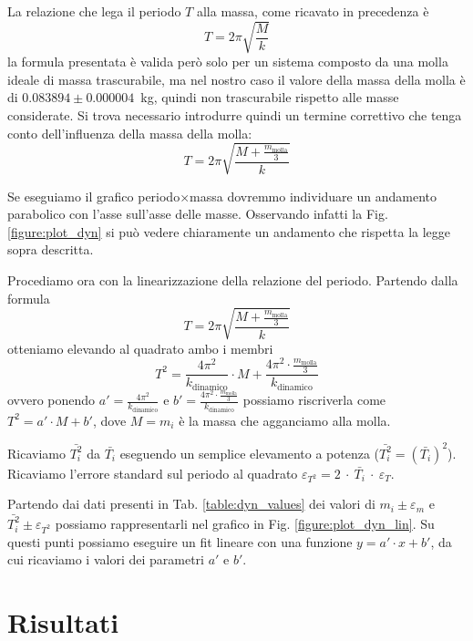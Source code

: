 \documentclass[italian, a4paper, 10pt, twocolumn]{../../style/lab_unige}
\newcommand{\reftab}[1]{Tab. {\ref{#1}}}%
\newcommand{\reffig}[1]{Fig. {\ref{#1}}}%
\begin{document}
{    La relazione che lega il periodo $T$ alla massa, come ricavato in precedenza è
    \[
        T = 2 \pi \sqrt{\frac{M}{k}}
    \]
    la formula presentata è valida però solo per un sistema composto da una molla ideale di massa trascurabile, 
    ma nel nostro caso il valore della massa della molla è di $0.083894\pm0.000004$~kg, quindi non trascurabile 
    rispetto alle masse considerate.
    Si trova necessario introdurre quindi un termine correttivo che tenga conto dell'influenza della massa della
    molla:
    \[
        T = 2 \pi \sqrt{\frac{M+\frac{m_{\text{molla}}}{3}}{k}}
    \]
    
    Se eseguiamo il grafico periodo$\times$massa dovremmo individuare un andamento parabolico con l'asse sull'asse 
    delle masse. Osservando infatti la \reffig{figure:plot_dyn} si può vedere chiaramente un andamento che rispetta
    la legge sopra descritta.

    Procediamo ora con la linearizzazione della relazione del periodo. Partendo dalla formula
    \[
        T = 2 \pi \sqrt{\frac{M+\frac{m_{\text{molla}}}{3}}{k}}
    \]
    otteniamo elevando al quadrato ambo i membri
    \[
        T^2 = \frac{4 \pi^2}{k_{\text{dinamico}}} \cdot M + \frac{4 \pi^2 \cdot \frac{m_{\text{molla}}}{3}}{k_{\text{dinamico}}}
    \]
    ovvero ponendo $a'=\frac{4 \pi^2}{k_{\text{dinamico}}}$ e 
    $b'=\frac{4 \pi^2 \cdot \frac{m_{\text{molla}}}{3}}{k_{\text{dinamico}}}$ possiamo riscriverla come 
    $T^2 = a'\cdot M + b'$, 
    dove $M=m_i$ è la massa che agganciamo alla molla.

    Ricaviamo $\bar{T_i^2}$ da $\bar{T_i}$ eseguendo un semplice elevamento a potenza ($\bar{T_i^2}=(\bar{T_i})^2$).
    Ricaviamo l'errore standard sul periodo al quadrato $\varepsilon_{T^2} = 2~\cdot~\bar{T_i}~\cdot~\varepsilon_{T}$.

    Partendo dai dati presenti in \reftab{table:dyn_values} dei valori di $m_i\pm\varepsilon_m$ e 
    $\bar{T_i^2}\pm\varepsilon_{T^2}$ possiamo rappresentarli nel grafico in \reffig{figure:plot_dyn_lin}.
    Su questi punti possiamo eseguire un fit lineare con una funzione $y = a'\cdot x + b'$, da cui ricaviamo i 
    valori dei parametri $a'$ e $b'$.

    \section{Risultati}
    \label{section:results}

}
\end{document}

